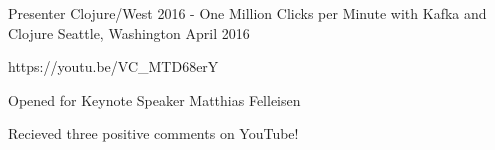 

\begin{cventries}

	\cventry
	{Presenter}
	{Clojure/West 2016 - One Million Clicks per Minute with Kafka and Clojure}
	{Seattle, Washington}
	{April 2016}
	{
		\begin{cvitems}
		\item {https://youtu.be/VC\_MTD68erY}
		\item {Opened for Keynote Speaker Matthias Felleisen}
		\item {Recieved three positive comments on YouTube!}
		\end{cvitems}
	}

\end{cventries}
